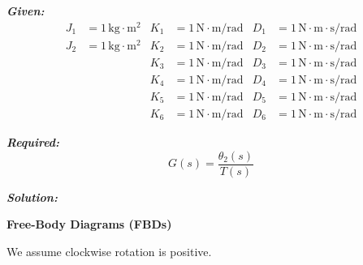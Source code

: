 \documentclass[11pt]{article}
\begin{document}
\vspace{12pt}

\noindent\textbf{\textit{Given:}}
\[
\begin{aligned}
J_1 &= 1\, \text{kg}\cdot\text{m}^2 & K_1 &= 1\, \text{N}\cdot\text{m/rad} & D_1 &= 1\, \text{N}\cdot\text{m}\cdot\text{s/rad} \\
J_2 &= 1\, \text{kg}\cdot\text{m}^2 & K_2 &= 1\, \text{N}\cdot\text{m/rad} & D_2 &= 1\, \text{N}\cdot\text{m}\cdot\text{s/rad} \\
& & K_3 &= 1\, \text{N}\cdot\text{m/rad} & D_3 &= 1\, \text{N}\cdot\text{m}\cdot\text{s/rad} \\
& & K_4 &= 1\, \text{N}\cdot\text{m/rad} & D_4 &= 1\, \text{N}\cdot\text{m}\cdot\text{s/rad} \\
& & K_5 &= 1\, \text{N}\cdot\text{m/rad} & D_5 &= 1\, \text{N}\cdot\text{m}\cdot\text{s/rad} \\
& & K_6 &= 1\, \text{N}\cdot\text{m/rad} & D_6 &= 1\, \text{N}\cdot\text{m}\cdot\text{s/rad}
\end{aligned}
\]

\vspace{12pt}

\noindent \textbf{\textit{Required:}}
\[
G(s) = \frac{\theta_2(s)}{T(s)}
\]

\vspace{12pt}


\noindent\textbf{\textit{Solution:}}

\vspace{12pt}

\noindent\textbf{Free-Body Diagrams (FBDs)}

\vspace{12pt}

We assume clockwise rotation is positive.
\end{document}
